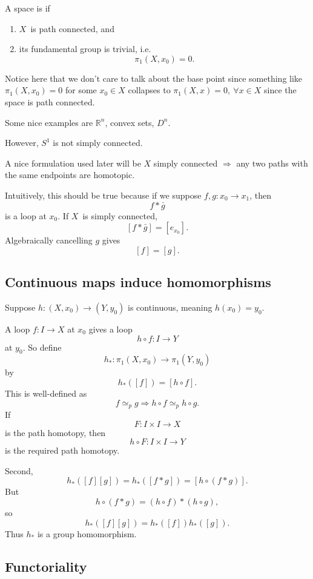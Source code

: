 \documentclass[11pt]{article}
\begin{document}
\begin{defn}
    A space is  if 
    \begin{enumerate}
        \item $X$ is path connected, and 
        \item its fundamental group is trivial, i.e. 
            \[
                \pi_1(X,x_0) = 0. 
            \]
    \end{enumerate}
\end{defn}
Notice here that we don't care to talk about the base 
point since something like $\pi_1(X,x_0) = 0$ for 
some $x_0 \in X$ collapses to $\pi_1(X,x) = 0, \ \forall x \in X$ 
since the space is path connected. 

Some nice examples are $\mathbb R^n$, convex sets, 
$D^n$. 

However, $S^1$ is not simply connected. 

A nice formulation used later will be 
$X$ simply connected $\Rightarrow$ any two paths with the 
same endpoints are homotopic.

Intuitively, this should be true because if we suppose 
$f,g : x_0 \to x_1$, then 
\[
    f * \bar g
\]
is a loop at $x_0$. If $X$ is simply connected, 
\[
    [f*\bar g] = [e_{x_0}].
\]
Algebraically cancelling $g$ gives 
\[
    [f] = [g].
\]

\subsection{Continuous maps induce homomorphisms}

Suppose $h : (X,x_0) \to (Y,y_0)$ is continuous, meaning 
$h(x_0) = y_0$. 

A loop $f : I \to X$ at $x_0$ gives a loop 
\[
    h \circ f : I \to Y
\]
at $y_0$. 
So define 
\[
    h_* : \pi_1(X,x_0) \to \pi_1(Y,y_0)
\]
by 
\[
    h_*([f]) = [h \circ f]. 
\]
This is well-defined as 
\[
    f \simeq_p g \Rightarrow h \circ f \simeq_p h \circ g. 
\]
If 
\[
    F : I \times I \to X
\]
is the path homotopy, then 
\[
    h \circ F : I \times I \to Y
\]
is the required path homotopy.

Second, 
\[
    h_*([f][g]) = h_*([f*g]) = [h \circ (f * g)].
\]
But 
\[
    h \circ (f * g) = (h \circ f) * (h \circ g), 
\]
so 
\[
    h_*([f][g])
=
h_*([f])h_*([g]).
\]
Thus $h_*$ is a group homomorphism.

\subsection{Functoriality}
\end{document}
